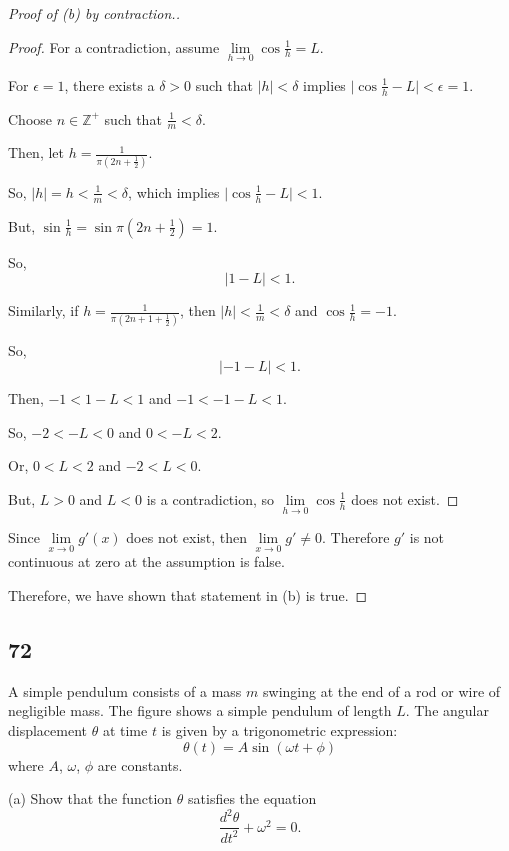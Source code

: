 \documentclass[../hw3.tex]{subfiles}
\begin{document}
\begin{proof}[Proof of (b) by contraction.]
    \begin{proof}
        For a contradiction, assume $\lim\limits_{h \to 0} \cos{\frac{1}{h}} = L$.

        For $\epsilon=1$, there exists a $\delta>0$ such that $|h|<\delta$ implies $\Big| \cos{\frac{1}{h}}-L \Big| < \epsilon=1$.

        Choose $n \in \mathbb{Z}^+$ such that $\frac{1}{m} < \delta$.

        Then, let $h = \frac{1}{\pi\left( 2n+\frac{1}{2} \right)}$.

        So, $|h| = h < \frac{1}{m} < \delta$, which implies $\Big|\cos{\frac{1}{h}}-L \Big|<1$.

        But, $\sin{\frac{1}{h}} = \sin{\pi\left( 2n+\frac{1}{2} \right)} = 1$.

        So, \[|1-L|<1.\]

        Similarly, if $h = \frac{1}{\pi\left( 2n+1+\frac{1}{2} \right)}$, then $|h|<\frac{1}{m}<\delta$ and $\cos{\frac{1}{h}}=-1$.

        So, \[|-1-L|<1.\]

        Then, $-1<1-L<1$ and $-1<-1-L<1$.
        
        So, $-2<-L<0$ and $0<-L<2$.
        
        Or, $0<L<2$ and $-2<L<0$.

        But, $L>0$ and $L<0$ is a contradiction, so $\lim\limits_{h \to 0} \cos{\frac{1}{h}}$ does not exist.
    \end{proof}

    Since $\lim\limits_{x \to 0} g'(x)$ does not exist, then $\lim\limits_{x \to 0} g' \neq 0$. Therefore $g'$ is not continuous at zero at the assumption is false.

    Therefore, we have shown that statement in (b) is true.

\end{proof}



\subsection*{72}
A simple pendulum consists of a mass $m$ swinging at the end of a rod or wire of negligible mass. The figure shows a simple pendulum of length $L$. The angular displacement $\theta$ at time $t$ is given by a trigonometric expression:
\[\theta(t) = A\sin{(\omega t + \phi)}\]
where $A$, $\omega$, $\phi$ are constants.

(a) Show that the function $\theta$ satisfies the equation
\[\frac{d^2\theta}{dt^2} + {\omega}^2 = 0.\]
\end{document}
